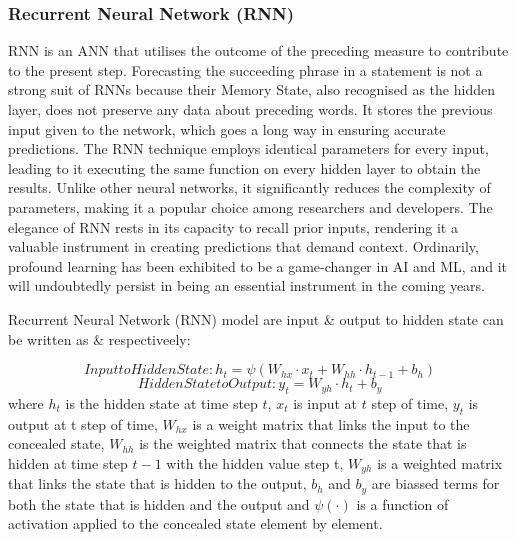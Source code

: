 \documentclass[a4paper, fleqn]{cas-sc}
\theoremstyle{definition}
\theoremstyle{remark}
\begin{document}
\subsubsection{Recurrent Neural Network (RNN)}
RNN is an ANN that utilises the outcome of the preceding measure to contribute to the present step. Forecasting the succeeding phrase in a statement is not a strong suit of RNNs because their Memory State,  also recognised as the hidden layer,  does not preserve any data about preceding words. It stores the previous input given to the network,  which goes a long way in ensuring accurate predictions. The RNN technique employs identical parameters for every input,  leading to it executing the same function on every hidden layer to obtain the results. Unlike other neural networks, it significantly reduces the complexity of parameters,  making it a popular choice among researchers and developers. The elegance of RNN rests in its capacity to recall prior inputs,  rendering it a valuable instrument in creating predictions that demand context. Ordinarily,  profound learning has been exhibited to be a game-changer in AI and ML,  and it will undoubtedly persist in being an essential instrument in the coming years.

Recurrent Neural Network (RNN) model are input \& output to hidden state can be written as  \&  respectiveely: 

  \begin{equation} \label{equ: ih rnn}
    Input to Hidden State:  h_t= \psi (W_{hx} \cdot x_t + W_{hh} \cdot h_{t-1} +b_h)
  \end{equation}
  \begin{equation} \label{equ: h rnn}
    Hidden State to Output:  y_t=W_{yh}\cdot h_t+b_y
  \end{equation}
where $h_t $ is the hidden state at time step $t$,  $x_t$ is input at $t$ step of time,  $y_t$ is output at t step of time,  $W_{hx} $ is a weight matrix that links the input to the concealed state,  $W_{hh}$ is the weighted matrix that connects the state that is hidden at time step $t-1$ with the hidden value step t,  $W_{yh}$ is a weighted matrix that links the state that is hidden to the output,  $b_h$ and $b_y$ are biassed terms for both the state that is hidden and the output and $\psi (\cdot)$ is a function of activation applied to the concealed state element by element.
\end{document}
